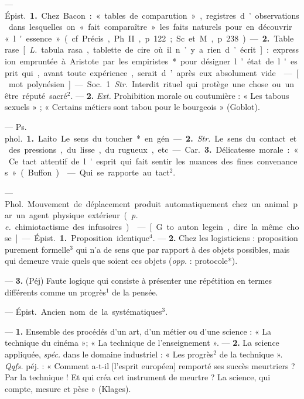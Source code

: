 
	\begin{itemize}[leftmargin=1cm, label=, itemsep=1pt]

 — \si{Épist.} {\bf 1.} Chez Bacon : « tables
de comparution », registres d’observations dans lesquelles on « fait
comparaître » les faits naturels pour
en découvrir « l'essence » (cf. Précis,
Ph. II, p. 122 ; Sc. et M., p. 238). —
 {\bf 2.} Table rase [{\it L.} tabula rasa, tablette de cire où il n’y a rien d’écrit] :
expression empruntée à Aristote
par les empiristes* pour désigner
l’état de l'esprit qui, avant toute
expérience, serait d’après eux absolument vide.

 — [mot polynésien] — \si{Soc.}
1. {\it Str.} Interdit rituel qui protège
une chose ou un être réputé sacré$^2$.
— {\bf 2.} {\it Ext.} Prohibition morale ou coutumière : « Les tabous sexuels » ;
« Certains métiers sont tabou pour
le bourgeois » (Goblot).

 — \si{Ps. phol.} {\bf 1.} Laito. Le sens du
toucher* en gén. — {\bf 2.} {\it Str.} Le sens
du contact et des pressions, du lisse,
du rugueux, etc.

— \si{Car.} {\bf 3.} Délicatesse morale :
« Ce tact attentif de l'esprit qui fait
sentir les nuances des fines convenances » (Buffon).

 — Qui se rapporte au tact$^2$.

 — \si{Phol.} Mouvement de
déplacement produit automatiquement chez un animal par un agent
physique extérieur ({\it p. e.} chimiotactisme des infusoires).

 — [G. to auton legein, dire la
même chose] — \si{Épist.} {\bf 1.} Proposition identique$^4$. — {\bf 2.} Chez les logisticiens : proposition purement formelle$^3$ qui n’a de sens que par rapport
à des objets possibles, mais qui demeure vraie quels que soient ces
objets ({\it opp.} : protocole*).

— {\bf 3.} (Péj) Faute logique qui
consiste à présenter une répétition
en termes différents comme un progrès$^1$ de la pensée.

 — \si{Épist.}
Ancien nom de la systématiques$^3$.

 — {\bf 1.} Ensemble des
procédés d’un art, d’un métier ou
d’une science : « La technique du
cinéma »; « La technique de l'enseignement ». — {\bf 2.} La science appliquée, {\it spéc.} dans le domaine industriel : « Les progrès$^2$ de la technique ». {\it Qqfs.} péj. : « Comment a-t-il
[l'esprit européen] remporté ses
succès meurtriers ? Par la technique !
Et qui créa cet instrument de
meurtre ? La science, qui compte,
mesure et pèse » (Klages).


\end{itemize}

